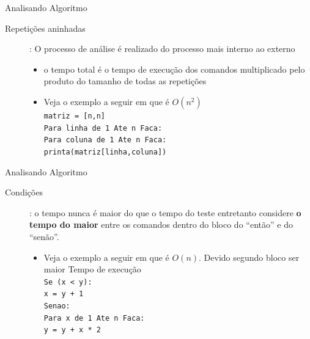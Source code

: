 \documentclass{beamer}
\begin{document}
\begin{frame}{Analisando Algoritmo}

\begin{description}
 \item[Repetições aninhadas]: O processo de análise é realizado do processo mais interno ao externo
\begin{itemize}
 \item o tempo total é o tempo de execução dos comandos multiplicado pelo produto do tamanho de todas as repetições
 \item Veja o exemplo a seguir em que é $O(n^2)$\\
   \texttt{matriz = [n,n] \\
   Para linha de 1 Ate n Faca:\\
   \hspace{1 cm}Para coluna de 1 Ate n Faca:\\
        \hspace{1.5 cm}printa(matriz[linha,coluna])}
\end{itemize}

\end{description}

\end{frame}


\begin{frame}{Analisando Algoritmo}

\begin{description}
 \item[Condições]: o tempo nunca é maior do que o tempo do teste entretanto considere \textbf{o tempo do maior} entre os comandos dentro do bloco do ``então'' e do ``senão''.
\begin{itemize}
 
 \item Veja o exemplo a seguir em que é $O(n)$. Devido segundo bloco ser maior Tempo de execução\\
   \texttt{Se (x < y): \\
   \hspace{1 cm}x = y + 1\\
   Senao:\\
   \hspace{1 cm}Para x de 1 Ate n Faca:\\
        \hspace{1 cm}y = y + x * 2}
\end{itemize}
\end{description}

\end{frame}
\end{document}
